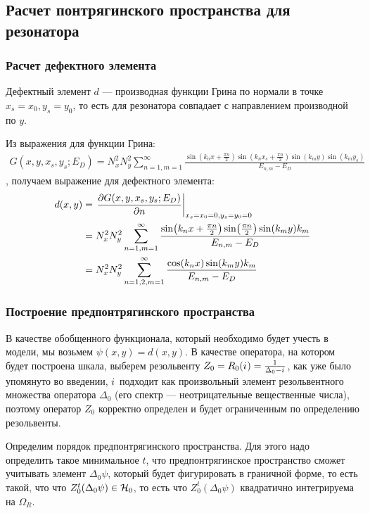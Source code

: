 \subsection{Расчет понтрягинского пространства для резонатора}
\subsubsection{Расчет дефектного элемента}
Дефектный элемент $d$ — производная функции Грина по нормали в точке $x_s = x_0, y_s = y_0$, то есть для резонатора совпадает с направлением производной по $y$.

Из выражения для функции Грина:
\begin{align*}
G(x, y, x_s, y_s; E_D) = N_x^2 N_y^2 \sum\limits_{n = 1, m = 1}^\infty \frac{\sin(k_n x + \frac{\pi n}{2}) \sin(k_n x_s  + \frac{\pi n}{2}) \sin(k_m y) \sin(k_m y_s)}{E_{n, m} - E_D}
\end{align*}
, получаем выражение для дефектного элемента:
\begin{align*}
d(x, y) 
&= \eval{\pdv{G(x, y, x_s, y_s; E_D)}{n}}_{x_s = x_0 = 0, y_s = y_0 = 0} \\
&= N_x^2 N_y^2 \sum\limits_{n = 1, m = 1}^\infty \frac{\sin(k_n x + \frac{\pi n}{2}) \sin(\frac{\pi n}{2}) \sin(k_m y) k_m}{E_{n, m} - E_D} \\
& = N_x^2 N_y^2 \sum\limits_{n = 1,2, m = 1}^\infty \frac{\cos(k_n x) \sin(k_m y) k_m}{E_{n, m} - E_D}
\end{align*}


\subsubsection{Построение предпонтрягинского пространства}
В качестве обобщенного функционала, который необходимо будет учесть в модели, мы возьмем $\psi(x, y) = d(x, y)$.
В качестве оператора, на котором будет построена шкала, выберем резольвенту $Z_0 = R_0({i\mkern1mu}) = \frac{1}{\Delta_0 - {i\mkern1mu}}$, как уже было упомянуто во введении, ${i\mkern1mu}$ подходит как произвольный элемент резольвентного множества оператора $\Delta_0$ (его спектр — неотрицательные вещественные числа), поэтому оператор $Z_0$ корректно определен и будет ограниченным по определению резольвенты.

Определим порядок предпонтрягинского пространства. Для этого надо определить такое минимальное $t$, что предпонтрягинское пространство сможет учитывать элемент $\Delta_0 \psi$, который будет фигурировать в граничной форме, то есть такой, что что $Z_0^t (\Delta_0 \psi) \in \mathcal{H}_{0}$, то есть что $Z_0^t (\Delta_0 \psi)$ квадратично интегрируема на $\Omega_R$.

